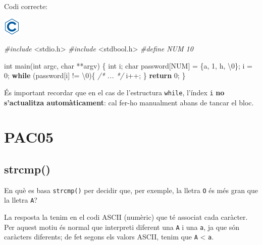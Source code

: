 \documentclass[
]{book}
\newenvironment{Shaded}{\begin{snugshade}}{\end{snugshade}}
\newcommand{\CharTok}[1]{\textcolor[rgb]{0.31,0.60,0.02}{#1}}
\newcommand{\CommentTok}[1]{\textcolor[rgb]{0.56,0.35,0.01}{\textit{#1}}}
\newcommand{\ControlFlowTok}[1]{\textcolor[rgb]{0.13,0.29,0.53}{\textbf{#1}}}
\newcommand{\DataTypeTok}[1]{\textcolor[rgb]{0.13,0.29,0.53}{#1}}
\newcommand{\DecValTok}[1]{\textcolor[rgb]{0.00,0.00,0.81}{#1}}
\newcommand{\ImportTok}[1]{#1}
\newcommand{\NormalTok}[1]{#1}
\newcommand{\PreprocessorTok}[1]{\textcolor[rgb]{0.56,0.35,0.01}{\textit{#1}}}
\begin{document}
Codi correcte:

\includegraphics{./img/c.png}

\begin{Shaded}
\begin{Highlighting}[]
\PreprocessorTok{\#include }\ImportTok{\textless{}stdio.h\textgreater{}}
\PreprocessorTok{\#include }\ImportTok{\textless{}stdbool.h\textgreater{}}
\PreprocessorTok{\#define NUM 10}

\DataTypeTok{int}\NormalTok{ main(}\DataTypeTok{int}\NormalTok{ argc, }\DataTypeTok{char}\NormalTok{ **argv) \{}
    \DataTypeTok{int}\NormalTok{ i;}
    \DataTypeTok{char}\NormalTok{ password[NUM] = \{}\CharTok{\textquotesingle{}a\textquotesingle{}}\NormalTok{, }\CharTok{\textquotesingle{}1\textquotesingle{}}\NormalTok{, }\CharTok{\textquotesingle{}h\textquotesingle{}}\NormalTok{, }\CharTok{\textquotesingle{}\textbackslash{}0\textquotesingle{}}\NormalTok{\};}
\NormalTok{    i = }\DecValTok{0}\NormalTok{;}
    \ControlFlowTok{while}\NormalTok{ (password[i] != }\CharTok{\textquotesingle{}\textbackslash{}0\textquotesingle{}}\NormalTok{)\{}
        \CommentTok{/* ... */}
\NormalTok{    i++;}
\NormalTok{    \}}
    \ControlFlowTok{return} \DecValTok{0}\NormalTok{;}
\NormalTok{\}}
\end{Highlighting}
\end{Shaded}

És important recordar que en el cas de l'estructura \texttt{while}, l'índex \texttt{i} \textbf{no s'actualitza automàticament}: cal fer-ho manualment abans de tancar el bloc.

\hypertarget{pac05}{%
\chapter{PAC05}\label{pac05}}

\hypertarget{strcmp}{%
\section{strcmp()}\label{strcmp}}

En què es basa \texttt{strcmp()} per decidir que, per exemple, la lletra \texttt{\textquotesingle{}O\textquotesingle{}} és més gran que la lletra \texttt{\textquotesingle{}A\textquotesingle{}}?

La resposta la tenim en el codi ASCII (numèric) que té associat cada caràcter. Per aquest motiu és normal que interpreti diferent una \texttt{\textquotesingle{}A\textquotesingle{}} i una \texttt{\textquotesingle{}a\textquotesingle{}}, ja que són caràcters diferents; de fet segons els valors ASCII, tenim que \texttt{\textquotesingle{}A\textquotesingle{}} \textless{} \texttt{\textquotesingle{}a\textquotesingle{}}.
\end{document}
